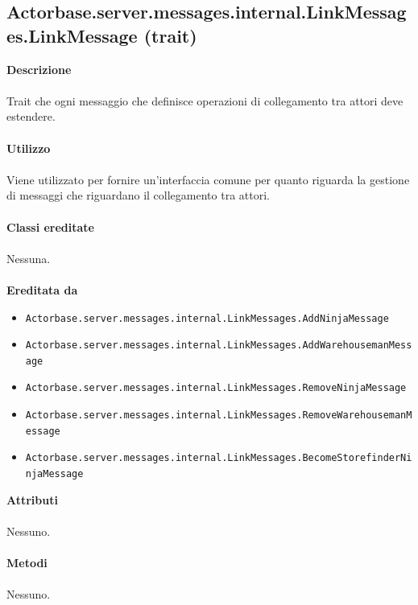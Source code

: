 \documentclass[a4paper]{article}
\begin{document}
	\subsection{Actorbase.server.messages.internal.LinkMessages.LinkMessage (trait)}
		\textbf{Descrizione}
			\\ \\
			Trait che ogni messaggio che definisce operazioni di collegamento tra attori deve estendere.
			\\ \\
		\textbf{Utilizzo}
			\\ \\
			Viene utilizzato per fornire un'interfaccia comune per quanto riguarda la gestione di messaggi che riguardano il collegamento tra attori.
			\\ \\
		\textbf{Classi ereditate}
			\\ \\
			Nessuna.
			\\ \\
		\textbf{Ereditata da}
			\begin{itemize}
				\item \texttt{Actorbase.server.messages.internal.LinkMessages.AddNinjaMessage}
				\item \texttt{Actorbase.server.messages.internal.LinkMessages.AddWarehousemanMessage}
				\item \texttt{Actorbase.server.messages.internal.LinkMessages.RemoveNinjaMessage}
				\item \texttt{Actorbase.server.messages.internal.LinkMessages.RemoveWarehousemanMessage}
				\item \texttt{Actorbase.server.messages.internal.LinkMessages.BecomeStorefinderNinjaMessage}
			\end{itemize}
		\textbf{Attributi}
			\\ \\
			Nessuno.
			\\ \\
		\textbf{Metodi}
			\\ \\
			Nessuno.
			
\end{document}
